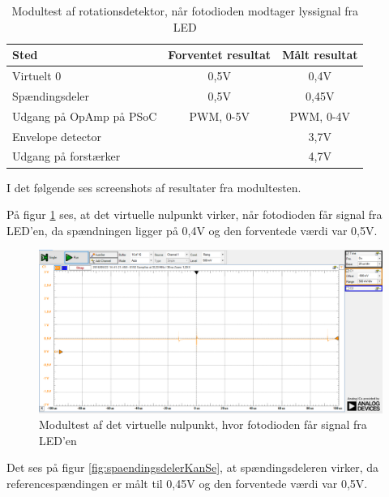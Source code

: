 \begin{table}[H]
	\centering
	\begin{tabular}{|l|c|c|}
		\hline
		\textbf{Sted}           & \textbf{Forventet resultat} & \textbf{Målt resultat} \\ \hline
		Virtuelt 0              & 0,5V                        & 0,4V                   \\ \hline
		Spændingsdeler          & 0,5V                        & 0,45V                  \\ \hline
		Udgang på OpAmp på PSoC & PWM, 0-5V                   & PWM, 0-4V              \\ \hline
		Envelope detector       & \multicolumn{1}{l|}{}       & 3,7V                   \\ \hline
		Udgang på forstærker    & \multicolumn{1}{l|}{}       & 4,7V                   \\ \hline
	\end{tabular}
	\caption{Modultest af rotationsdetektor, når fotodioden modtager lyssignal fra LED}
	\label{dioderSe}
\end{table}

I det følgende ses screenshots af resultater fra modultesten. 

På figur \ref{fig:virt0KanSe} ses, at det virtuelle nulpunkt virker, når fotodioden får signal fra LED'en, da spændningen ligger på 0,4V og den forventede værdi var 0,5V. 

\begin{figure}[H]
	\centering
	\includegraphics[width=\textwidth]{Test/images/AffyringTest/KanSe/virtuelt_nul}
	\caption{Modultest af det virtuelle nulpunkt, hvor fotodioden får signal fra LED'en}
	\label{fig:virt0KanSe}
\end{figure}

Det ses på figur \ref{fig:spaendingsdelerKanSe}, at spændingsdeleren virker, da referencespændingen er målt til 0,45V og den forventede værdi var 0,5V. 

